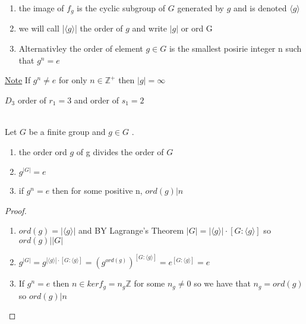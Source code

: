 \documentclass{article}
\begin{document}
\begin{definition}
    \begin{enumerate}
        \item the image of $f_g$ is the cyclic subgroup of $G$ generated by $g$ and is denoted $\langle g \rangle$
        \item we will call |$\langle g \rangle$| the order of $g$ and write $|g|$ or ord G
        \item Alternativley the order of element $g\in G $ is the smallest posirie integer n such that $g^n = e$
    \end{enumerate}
\end{definition}
\underline{Note} If $g^n \not = e$ for only $n \in \mathbb{Z}^+$ then $|g| = \infty$ \\
\begin{definition}
    $D_3$ order of $r_1 = 3$ and order of $s_1 = 2$
\end{definition} 
\begin{proposition}[2.6.3] \leavevmode \\ 
    Let $G$ be a finite group and $g \in G$ . 
    \begin{enumerate}
        \item the order ord $g$ of g divides the order of $G$
        \item $ g^{|G|} = e$
        \item if $g^n = e$ then for some positive n, $ord(g) | n$
    \end{enumerate}
    
    
\end{proposition}
\begin{proof}
    \leavevmode \\ 
    \begin{enumerate}
        \item $ord(g) = | \langle g \rangle |$ and BY Lagrange's Theorem $|G| = | \langle g \rangle | \cdot [G : \langle g \rangle ]$ so $ord(g) | |G|$
        \item $g^{|G|} = g^{| \langle g \rangle | \cdot [G : \langle g \rangle ]} = (g^{ord(g)})^{[G : \langle g \rangle ]} = e^{[G : \langle g \rangle ]} = e$
        \item If $g^n  = e$ then $n \in ker f_g = n_g \mathbb{Z}$ for some $n_g \not = 0 $ so we have that $n_g = ord(g)$ so $ord(g) | n$
    \end{enumerate}
\end{proof}
 
\end{document}
